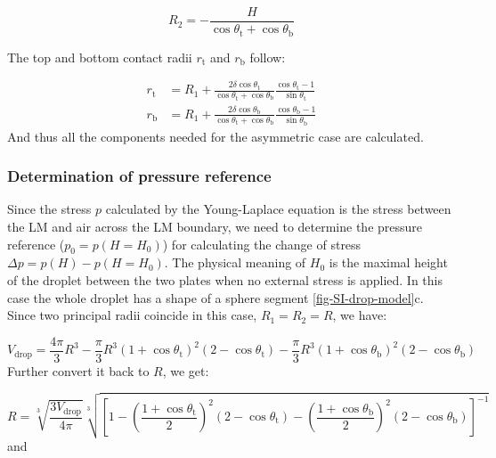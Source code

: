 \begin{equation}
\label{eq:small-asym-R2}
R_{2} = -{\displaystyle \frac{H}{\cos \theta_{\mathrm{t}} + \cos \theta_{\mathrm{b}}}}
\end{equation}

The top and bottom
contact radii \(r_{\mathrm{t}}\) and \(r_{\mathrm{b}}\) follow:

\begin{eqnarray}
\label{eq:small-t-1}
r_{\mathrm{t}} &= R_{1} + {\displaystyle \frac{2\delta \cos \theta_{\mathrm{t}}}{\cos \theta_{\mathrm{t}} 
                                + \cos \theta_{\mathrm{b}}}
                          \frac{\cos \theta_{\mathrm{t}} - 1}{\sin \theta_{\mathrm{t}}}}\\
\label{eq:small-t-2}
r_{\mathrm{b}} &= R_{1} + {\displaystyle \frac{2\delta \cos \theta_{\mathrm{b}}}{\cos \theta_{\mathrm{t}} 
                                + \cos \theta_{\mathrm{b}}}
                          \frac{\cos \theta_{\mathrm{b}} - 1}{\sin \theta_{\mathrm{b}}}}
\end{eqnarray}
And thus all the components needed for the asymmetric case are calculated.

\subsubsection{Determination of pressure reference}
\label{sec:small-orgdade735}
Since the stress \(p\) calculated by the Young-Laplace equation is
the stress between the LM and air across the LM boundary, we need
to determine the pressure reference (\(p_{0} = p(H=H_{0})\)) for
calculating the change of stress \(\Delta p=p(H) - p(H=H_{0})\). The
physical meaning of \(H_{0}\) is the maximal height of the droplet
between the two plates when no external stress is applied. In this
case the whole droplet has a shape of a sphere segment 
\autoref{fig-SI-drop-model}c. Since two principal radii coincide in this
case, \(R_{1}=R_{2}=R\), we have:

\begin{equation}
\label{eq:small-5}
V_{\mathrm{drop}} = \frac{4 \pi}{3} R^{3} - \frac{\pi}{3} R^{3} (1 + \cos \theta_{\mathrm{t}})^{2}(2 - \cos \theta_{\mathrm{t}})
                                          - \frac{\pi}{3} R^{3} (1 + \cos \theta_{\mathrm{b}})^{2}(2 - \cos \theta_{\mathrm{b}})
\end{equation}
Further convert it back to \(R\), we get:

\begin{equation}
\label{eq:small-8}
R = \sqrt[3]{\frac{3 V_{\mathrm{drop}}}{4 \pi}} \sqrt[3]{\left[ 
1 - \left(\frac{1 + \cos \theta_{\mathrm{t}}}{2} \right)^{2} \left(2 - \cos \theta_{\mathrm{t}}\right)
- \left(\frac{1 + \cos \theta_{\mathrm{b}}}{2} \right)^{2} \left(2 - \cos \theta_{\mathrm{b}}\right)
\right]^{-1}}
\end{equation}
and

